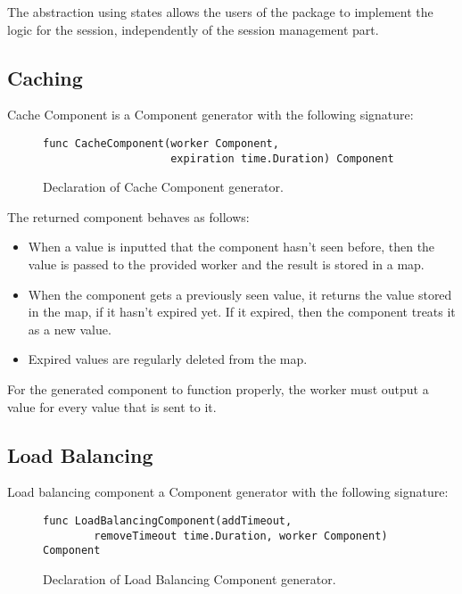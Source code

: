 \documentclass[12pt,a4paper]{article}
\begin{document}
The abstraction using states allows the users of the package to implement the
logic for the session, independently of the session management part.

\subsection{Caching}
Cache Component is a Component generator with the following signature:

\begin{figure}[h]
\centering
\begin{lstlisting}
func CacheComponent(worker Component, 
					expiration time.Duration) Component
\end{lstlisting}
\caption[scale=1.0]{Declaration of Cache Component generator.}
\label{fig:cacheComp}
\end{figure}

The returned component behaves as follows:
\begin{itemize}
	\item When a value is inputted that the component hasn't seen before, then
				the value is passed to the provided worker and the result is stored in
				a map.
	\item When the component gets a previously seen value, it returns the value
			  stored in the map, if it hasn't expired yet. If it expired, then the component
				treats it as a new value.
	\item Expired values are regularly deleted from the map.
\end{itemize}

For the generated component to function properly, the worker must output
a value for every value that is sent to it.

\subsection{Load Balancing}
Load balancing component a Component generator with the following signature:

\begin{figure}[h]
\centering
\begin{lstlisting}
func LoadBalancingComponent(addTimeout, 
		removeTimeout time.Duration, worker Component) Component
\end{lstlisting}
\caption[scale=1.0]{Declaration of Load Balancing Component generator.}
\label{fig:loadComp}
\end{figure}
\end{document}
